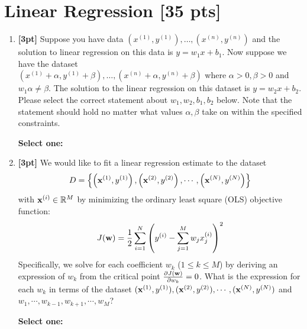 \documentclass[12pt]{article}
\renewcommand{\circle}{\tikz\draw[black] (0,0) circle (1ex);}
\begin{document}
\section{Linear Regression [35 pts]}
\begin{enumerate}

    \item \textbf{[3pt]} Suppose you have data ${(x^{(1)}, y^{(1)}), \ldots, (x^{(n)}, y^{(n)})}$ and the solution to linear regression on this data is $y = w_1 x + b_1$. Now suppose we have the dataset \\
    ${(x^{(1)} + \alpha, y^{(1)} + \beta), \ldots, (x^{(n)} + \alpha, y^{(n)} + \beta)}$ where $\alpha > 0, \beta > 0$ and $w_1 \alpha \neq \beta$. The solution to the linear regression on this dataset is $y = w_2 x + b_2$. Please select the correct statement about $w_1, w_2, b_1, b_2$ below. Note that the statement should hold no matter what values $\alpha, \beta$ take on within the specified constraints.
    
    \textbf{Select one:}
    

    \item \textbf{[3pt]} We would like to fit a linear regression estimate to the dataset 
    $$
    D = \left\{\left(\mathbf{x}^{(1)},y^{(1)}\right), \left(\mathbf{x}^{(2)},y^{(2)}\right),\cdots, \left(\mathbf{x}^{(N)},y^{(N)}\right)\right\}
    $$ with $\mathbf{x}^{(i)} \in \mathbb{R}^M$ by minimizing the ordinary least square (OLS) objective function:
    $$
    J(\mathbf{w}) = \frac{1}{2}\sum_{i=1}^N\left(y^{(i)} - \sum_{j=1}^M w_j x_j^{(i)}\right)^2
    $$
    Specifically, we solve for each coefficient $w_k$ ($1\leq k\leq M$) by deriving an expression of $w_k$ from the critical point $\frac{\partial J(\mathbf{w})}{\partial w_k} = 0$. What is the expression for each $w_k$ in terms of the dataset $(\mathbf{x}^{(1)},y^{(1)}), (\mathbf{x}^{(2)},y^{(2)}),\cdots, (\mathbf{x}^{(N)},y^{(N)})$ and $w_1,\cdots,w_{k-1},w_{k+1},\cdots,w_M$?

    \textbf{Select one:}


\end{enumerate}
\end{document}
